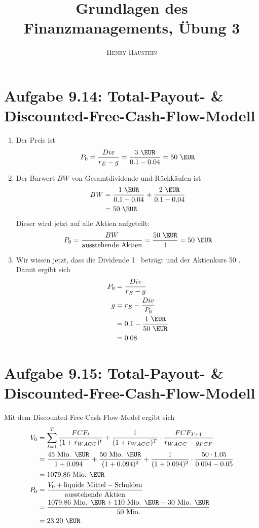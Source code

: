 \documentclass{article}
\title{\textbf{Grundlagen des Finanzmanagements, Übung 3}}
\author{\textsc{Henry Haustein}}
\date{}
\begin{document}
	\maketitle
	
	\section*{Aufgabe 9.14: Total-Payout- \& Discounted-Free-Cash-Flow-Modell}
	\begin{enumerate}[label=(\alph*)]
		\item Der Preis ist
		\begin{align}
			P_0 = \frac{Div}{r_E-g} = \frac{3\text{ \EUR}}{0.1 - 0.04} = 50\text{ \EUR} \notag
		\end{align}
		\item Der Barwert $BW$ von Gesamtdividende und Rückkäufen ist
		\begin{align}
			BW &= \frac{1\text{ \EUR}}{0.1 - 0.04} + \frac{2\text{ \EUR}}{0.1 - 0.04} \notag \\
			&= 50 \text{ \EUR} \notag
		\end{align}
		Dieser wird jetzt auf alle Aktien aufgeteilt:
		\begin{align}
			P_0 = \frac{BW}{\text{ausstehende Aktien}} = \frac{50\text{ \EUR}}{1} = 50 \text{ \EUR} \notag
		\end{align}
		\item Wir wissen jetzt, dass die Dividende 1 \EUR\, beträgt und der Aktienkurs 50 \EUR. Damit ergibt sich
		\begin{align}
			P_0 &= \frac{Div}{r_E-g} \notag \\
			g &= r_E - \frac{Div}{P_0} \notag \\
			&= 0.1 - \frac{1\text{ \EUR}}{50\text{ \EUR}} \notag \\
			&= 0.08 \notag
		\end{align}
	\end{enumerate}

	\section*{Aufgabe 9.15: Total-Payout- \& Discounted-Free-Cash-Flow-Modell}
	Mit dem Discounted-Free-Cash-Flow-Model ergibt sich
	\begin{align}
		V_0 &= \sum_{t=1}^{T} \frac{FCF_t}{(1+r_{WACC})^t} + \frac{1}{(1+r_{WACC})^T}\cdot\frac{FCF_{T+1}}{r_{WACC} - g_{FCF}} \notag \\
		&= \frac{45\text{ Mio. \EUR}}{1+0.094} + \frac{50\text{ Mio. \EUR}}{(1+0.094)^2} + \frac{1}{(1+0.094)^2}\cdot\frac{50\cdot 1.05}{0.094 - 0.05} \notag \\
		&= 1079.86\text{ Mio. \EUR} \notag \\
		P_0 &= \frac{V_0 + \text{liquide Mittel} - \text{Schulden}}{\text{ausstehende Aktien}} \notag \\
		&= \frac{1079.86\text{ Mio. \EUR} + 110 \text{ Mio. \EUR} - 30 \text{ Mio. \EUR}}{50 \text{ Mio.}} \notag \\
		&= 23.20 \text{ \EUR} \notag
	\end{align}
	
\end{document}
